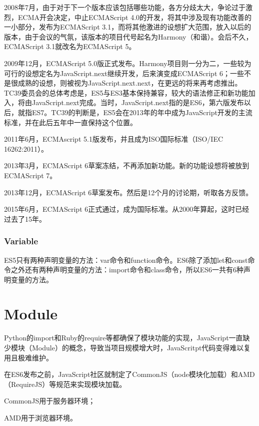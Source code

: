 2008年7月，由于对于下一个版本应该包括哪些功能，各方分歧太大，争论过于激烈，ECMA开会决定，中止ECMAScript 4.0的开发，将其中涉及现有功能改善的一小部分，发布为ECMAScript 3.1，而将其他激进的设想扩大范围，放入以后的版本，由于会议的气氛，该版本的项目代号起名为Harmony（和谐）。会后不久，ECMAScript 3.1就改名为ECMAScript 5。

2009年12月，ECMAScript 5.0版正式发布。Harmony项目则一分为二，一些较为可行的设想定名为JavaScript.next继续开发，后来演变成ECMAScript 6；一些不是很成熟的设想，则被视为JavaScript.next.next，在更远的将来再考虑推出。TC39委员会的总体考虑是，ES5与ES3基本保持兼容，较大的语法修正和新功能加入，将由JavaScript.next完成。当时，JavaScript.next指的是ES6，第六版发布以后，就指ES7。TC39的判断是，ES5会在2013年的年中成为JavaScript开发的主流标准，并在此后五年中一直保持这个位置。

2011年6月，ECMAscript 5.1版发布，并且成为ISO国际标准（ISO/IEC 16262:2011）。

2013年3月，ECMAScript 6草案冻结，不再添加新功能。新的功能设想将被放到ECMAScript 7。

2013年12月，ECMAScript 6草案发布。然后是12个月的讨论期，听取各方反馈。

2015年6月，ECMAScript 6正式通过，成为国际标准。从2000年算起，这时已经过去了15年。


\subsection{Variable}


ES5只有两种声明变量的方法：var命令和function命令。ES6除了添加let和const命令之外还有两种声明变量的方法：import命令和class命令，所以ES6一共有6种声明变量的方法。





\chapter{Module}

Python的import和Ruby的require等都确保了模块功能的实现，JavaScript一直缺少模块（Module）的概念，导致当项目规模增大时，JavaScritpt代码变得难以复用且极难维护。

在ES6发布之前，JavaScript社区就制定了CommonJS（node模块化加载）和AMD（RequireJS）等规范来实现模块加载。

\begin{compactitem}
\item CommonJS用于服务器环境；
\item AMD用于浏览器环境。
\end{compactitem}

